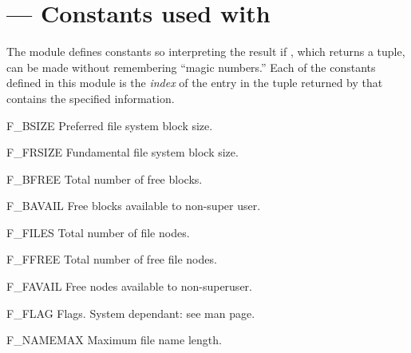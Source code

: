 \section{ ---
         Constants used with }


The  module defines constants so interpreting the result
if , which returns a tuple, can be made without
remembering ``magic numbers.''  Each of the constants defined in this
module is the \emph{index} of the entry in the tuple returned by
 that contains the specified information.


\begin{datadesc}{F_BSIZE}
Preferred file system block size.
\end{datadesc}

\begin{datadesc}{F_FRSIZE}
Fundamental file system block size.
\end{datadesc}

\begin{datadesc}{F_BFREE}
Total number of free blocks.
\end{datadesc}

\begin{datadesc}{F_BAVAIL}
Free blocks available to non-super user.
\end{datadesc}

\begin{datadesc}{F_FILES}
Total number of file nodes.
\end{datadesc}

\begin{datadesc}{F_FFREE}
Total number of free file nodes.
\end{datadesc}

\begin{datadesc}{F_FAVAIL}
Free nodes available to non-superuser.
\end{datadesc}

\begin{datadesc}{F_FLAG}
Flags. System dependant: see  man page.
\end{datadesc}

\begin{datadesc}{F_NAMEMAX}
Maximum file name length.
\end{datadesc}
